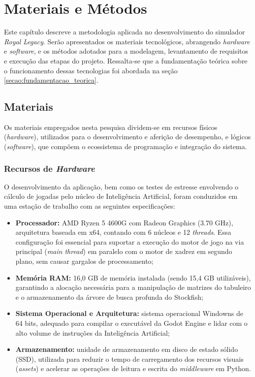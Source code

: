 \chapter{Materiais e Métodos}
\label{capitulo:materiais_metodos}

Este capítulo descreve a metodologia aplicada no desenvolvimento do simulador \textit{Royal Legacy}. Serão apresentados os materiais tecnológicos, abrangendo \textit{hardware} e \textit{software}, e os métodos adotados para a modelagem, levantamento de requisitos e execução das etapas do projeto. Ressalta-se que a fundamentação teórica sobre o funcionamento dessas tecnologias foi abordada na seção \ref{secao:fundamentacao_teorica}.

\section{Materiais}
\label{secao:materiais}

Os materiais empregados nesta pesquisa dividem-se em recursos físicos (\textit{hardware}), utilizados para o desenvolvimento e aferição de desempenho, e lógicos (\textit{software}), que compõem o ecossistema de programação e integração do sistema.

\subsection{Recursos de \textit{Hardware}}

O desenvolvimento da aplicação, bem como os testes de estresse envolvendo o cálculo de jogadas pelo núcleo de Inteligência Artificial, foram conduzidos em uma estação de trabalho com as seguintes especificações:

\begin{itemize}
	\item \textbf{Processador:} AMD Ryzen 5 4600G com Radeon Graphics (3.70 GHz), arquitetura baseada em x64, contando com 6 núcleos e 12 \textit{threads}. Essa configuração foi essencial para suportar a execução do motor de jogo na via principal (\textit{main thread}) em paralelo com o motor de xadrez em segundo plano, sem causar gargalos de processamento;
	\item \textbf{Memória RAM:} 16,0 GB de memória instalada (sendo 15,4 GB utilizáveis), garantindo a alocação necessária para a manipulação de matrizes do tabuleiro e o armazenamento da árvore de busca profunda do Stockfish;
	\item \textbf{Sistema Operacional e Arquitetura:} sistema operacional Windowns de 64 bits, adequado para compilar o executável da Godot Engine e lidar com o alto volume de instruções da Inteligência Artificial;
	\item \textbf{Armazenamento:} unidade de armazenamento em disco de estado sólido (SSD), utilizada para reduzir o tempo de carregamento dos recursos visuais (\textit{assets}) e acelerar as operações de leitura e escrita do \textit{middleware} em Python.
\end{itemize}

